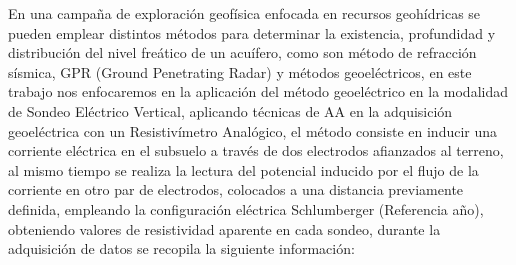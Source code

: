 \documentclass[sn-mathphys,Numbered]{sn-jnl}%
\theoremstyle{thmstyleone}%
\theoremstyle{thmstyletwo}%
\theoremstyle{thmstylethree}%
\begin{document}
En una campaña de exploración geofísica enfocada en recursos geohídricas se pueden emplear distintos métodos para determinar la existencia, profundidad y distribución del nivel freático de un acuífero, como son método de refracción sísmica, GPR (Ground Penetrating Radar) y métodos geoeléctricos, en este trabajo nos enfocaremos en la aplicación del método geoeléctrico en la modalidad de Sondeo Eléctrico Vertical, aplicando técnicas de AA en la adquisición geoeléctrica con un Resistivímetro Analógico, el método consiste en inducir una corriente eléctrica en el subsuelo a través de dos electrodos afianzados al terreno, al mismo tiempo se realiza la lectura del potencial inducido por el flujo de la corriente en otro par de electrodos, colocados a una distancia previamente definida, empleando la configuración eléctrica Schlumberger (Referencia año), obteniendo valores de resistividad aparente en cada sondeo, durante la adquisición de datos se recopila la siguiente información: 
\end{document}
